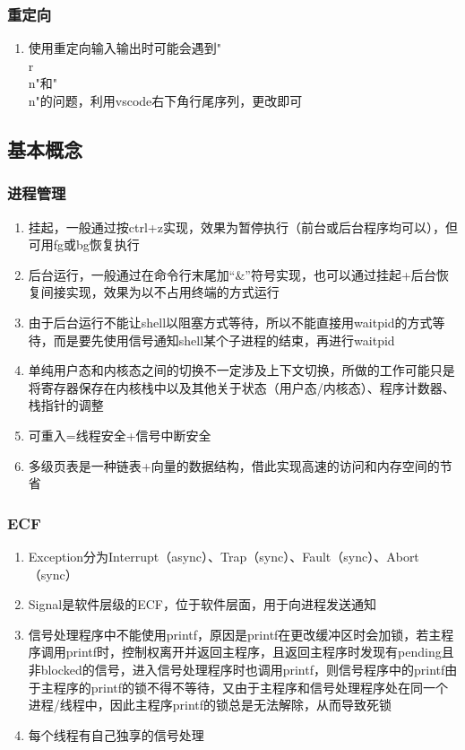 \documentclass[onecolumn]{article}
\begin{document}
        \subsubsection{重定向}
            \noindent
            \begin{enumerate}
                \item 使用重定向输入输出时可能会遇到"\\r\\n"和"\\n"的问题，利用vscode右下角行尾序列，更改即可
            \end{enumerate}
    \subsection{基本概念}
        \subsubsection{进程管理}
            \noindent
            \begin{enumerate}
                \item 挂起，一般通过按ctrl+z实现，效果为暂停执行（前台或后台程序均可以），但可用fg或bg恢复执行
                \item 后台运行，一般通过在命令行末尾加“\&”符号实现，也可以通过挂起+后台恢复间接实现，效果为以不占用终端的方式运行
                \item 由于后台运行不能让shell以阻塞方式等待，所以不能直接用waitpid的方式等待，而是要先使用信号通知shell某个子进程的结束，再进行waitpid
                \item 单纯用户态和内核态之间的切换不一定涉及上下文切换，所做的工作可能只是将寄存器保存在内核栈中以及其他关于状态（用户态/内核态）、程序计数器、栈指针的调整
                \item 可重入=线程安全+信号中断安全
                \item 多级页表是一种链表+向量的数据结构，借此实现高速的访问和内存空间的节省
            \end{enumerate}
        \subsubsection{ECF}
            \noindent
            \begin{enumerate}
                \item Exception分为Interrupt（async）、Trap（sync）、Fault（sync）、Abort（sync）
                \item Signal是软件层级的ECF，位于软件层面，用于向进程发送通知
                \item 信号处理程序中不能使用printf，原因是printf在更改缓冲区时会加锁，若主程序调用printf时，控制权离开并返回主程序，且返回主程序时发现有pending且非blocked的信号，进入信号处理程序时也调用printf，则信号程序中的printf由于主程序的printf的锁不得不等待，又由于主程序和信号处理程序处在同一个进程/线程中，因此主程序printf的锁总是无法解除，从而导致死锁
                \item 每个线程有自己独享的信号处理
            \end{enumerate}
\end{document}
